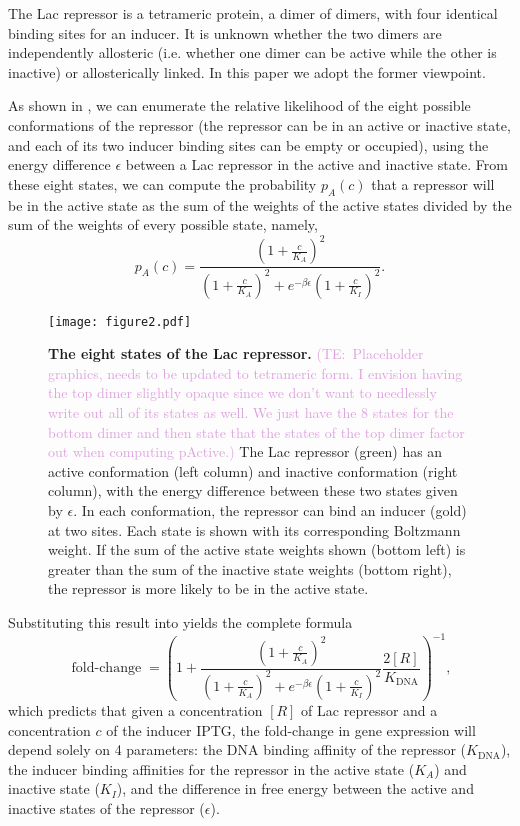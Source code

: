 \documentclass[10pt,letterpaper]{article}
\newcommand\globalScalePlots{1}
\newcommand{\talComment}[1]{\textcolor{Plum}{(TE:~#1)}}
\newcommand{\K}{K_{\text{DNA}}}
\newcommand \foldchange{\operatorname{fold-change}}
\begin{document}
The Lac repressor is a tetrameric protein, a dimer of dimers, with four
identical binding sites for an inducer. It is unknown whether the two dimers are independently allosteric (i.e. whether one dimer can be active while the other is inactive) or allosterically linked. In this paper we adopt the former viewpoint.

As shown in \fref[figrepressorInducerStates], we can enumerate the relative
likelihood of the eight possible conformations of the repressor (the repressor
can be in an active or inactive state, and each of its two inducer binding sites
can be empty or occupied), using the energy difference $\epsilon$ between a Lac
repressor in the active and inactive state. From these eight states, we can
compute the probability \(p_A(c)\) that a repressor will be in the active state
as the sum of the weights of the active states divided by the sum of the weights
of every possible state, namely,
\begin{equation}\label{eq6}
p_A(c)=\frac{\left(1+\frac{c}{K_A}\right)^2}{\left(1+\frac{c}{K_A}\right)^2+e^{-\beta  \epsilon }\left(1+\frac{c}{K_I}\right)^2}.
\end{equation}

\begin{figure}[h]
	\centering \texttt{[image: figure2.pdf]}
	\caption{{\bf The eight states of the Lac repressor.} \talComment{Placeholder graphics, needs to be updated to tetrameric form. I envision having the top dimer slightly opaque since we don't want to needlessly write out all of its states as well. We just have the 8 states for the bottom dimer and then state that the states of the top dimer factor out when computing pActive.} The Lac repressor (green)
		has an active conformation (left column) and inactive conformation (right
		column), with the energy difference between these two states given by
		$\epsilon$. In each conformation, the repressor can bind an inducer (gold) at
		two sites. Each state is shown with its corresponding Boltzmann weight. If the
		sum of the active state weights shown (bottom left) is greater than the sum of
		the inactive state weights (bottom right), the repressor is more likely to be
		in the active state.} \label{figrepressorInducerStates}
\end{figure}

Substituting this result into \eref[eq5] yields the complete formula
\begin{equation}\label{eq7}
\foldchange= \left(
1+\frac{\left(1+\frac{c}{K_A}\right)^2}{\left(1+\frac{c}{K_A}\right)^2+e^{-\beta
		\epsilon }\left(1+\frac{c}{K_I}\right)^2}\frac{2[R]}{\K} \right)^{-1},
\end{equation}
which predicts that given a concentration \([R]\) of Lac repressor and a
concentration \(c\) of the inducer IPTG, the fold-change in gene expression will
depend solely on 4 parameters: the DNA binding affinity of the repressor
(\(\K\)), the inducer binding affinities for the repressor in the active state
(\(K_A\)) and inactive state (\(K_I\)), and the difference in free energy
between the active and inactive states of the repressor (\(\epsilon\)).
\end{document}
